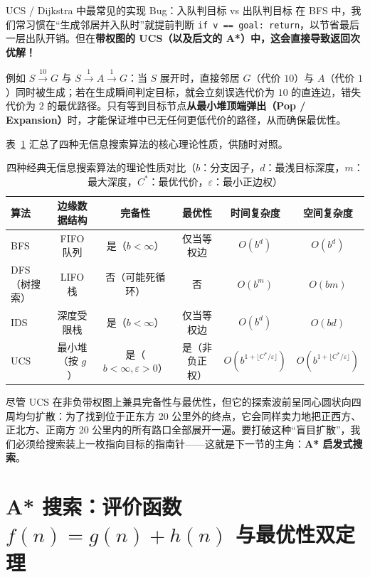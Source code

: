 \begin{failBox}{UCS / Dijkstra 中最常见的实现 Bug：入队判目标 vs 出队判目标}
在 BFS 中，我们常习惯在“生成邻居并入队时”就提前判断 \texttt{if v == goal: return}，以节省最后一层出队开销。但在\textbf{带权图的 UCS（以及后文的 A*）中，这会直接导致返回次优解！}

例如 $S \xrightarrow{10} G$ 与 $S \xrightarrow{1} A \xrightarrow{1} G$：当 $S$ 展开时，直接邻居 $G$（代价 $10$）与 $A$（代价 $1$）同时被生成；若在生成瞬间判定目标，就会立刻误选代价为 $10$ 的直连边，错失代价为 $2$ 的最优路径。只有等到目标节点\textbf{从最小堆顶端弹出（Pop / Expansion）}时，才能保证堆中已无任何更低代价的路径，从而确保最优性。
\end{failBox}

表~\ref{tab:uninformed-compare} 汇总了四种无信息搜索算法的核心理论性质，供随时对照。

\begin{table}[htbp]
\centering
\caption{四种经典无信息搜索算法的理论性质对比（$b$：分支因子，$d$：最浅目标深度，$m$：最大深度，$C^*$：最优代价，$\varepsilon$：最小正边权）}\label{tab:uninformed-compare}
\small
\begin{tabular}{@{}lccccc@{}}
\toprule
\textbf{算法} & \textbf{边缘数据结构} & \textbf{完备性} & \textbf{最优性} & \textbf{时间复杂度} & \textbf{空间复杂度} \\
\midrule
BFS & FIFO 队列 & 是（$b<\infty$） & 仅当等权边 & $O(b^d)$ & $O(b^d)$ \\
DFS（树搜索） & LIFO 栈 & 否（可能死循环） & 否 & $O(b^m)$ & $O(bm)$ \\
IDS & 深度受限栈 & 是（$b<\infty$） & 仅当等权边 & $O(b^d)$ & $O(bd)$ \\
UCS & 最小堆（按 $g$） & 是（$b<\infty, \varepsilon>0$） & 是（非负正权） & $O\!\left(b^{1+\lfloor C^*/\varepsilon\rfloor}\right)$ & $O\!\left(b^{1+\lfloor C^*/\varepsilon\rfloor}\right)$ \\
\bottomrule
\end{tabular}
\end{table}

尽管 UCS 在非负带权图上兼具完备性与最优性，但它的探索波前呈同心圆状向四周均匀扩散：为了找到位于正东方 20 公里外的终点，它会同样卖力地把正西方、正北方、正南方 20 公里内的所有路口全部展开一遍。要打破这种“盲目扩散”，我们必须给搜索装上一枚指向目标的指南针——这就是下一节的主角：\textbf{A* 启发式搜索}。

\section{A* 搜索：评价函数 $f(n)=g(n)+h(n)$ 与最优性双定理}\label{sec:astar}

